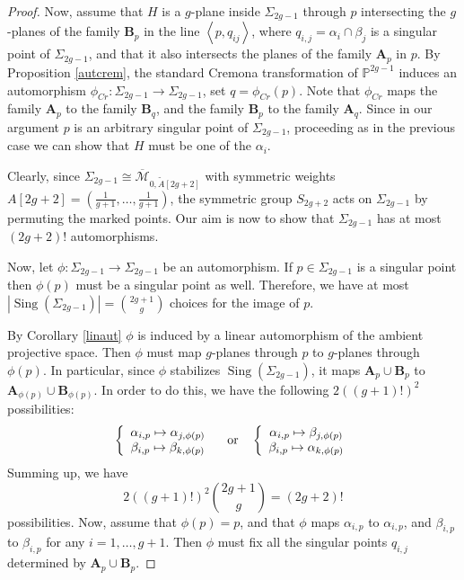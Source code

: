 \documentclass[a4paper,10pt]{amsart}
\theoremstyle{definition}
\newcommand{\cM}{\overline{\mathcal{M}}}
\DeclareMathOperator{\Sing}{Sing}
\begin{document}
\begin{proof}
Now, assume that $H$ is a $g$-plane inside $\Sigma_{2g-1}$ through $p$ intersecting the $g$-planes of the family $\textbf{B}_p$ in the line $\left\langle p, q_{ij}\right\rangle$, where $q_{i,j} = \alpha_i\cap \beta_j$ is a singular point of $\Sigma_{2g-1}$, and that it also intersects the planes of the family $\textbf{A}_p$ in $p$. By Proposition \ref{autcrem}, the standard Cremona transformation of $\mathbb{P}^{2g-1}$ induces an automorphism $\phi_{Cr}:\Sigma_{2g-1}\rightarrow \Sigma_{2g-1}$, set $q = \phi_{Cr}(p)$. Note that $\phi_{Cr}$ maps the family $\textbf{A}_p$ to the family $\textbf{B}_q$, and the family $\textbf{B}_p$ to the family $\textbf{A}_q$. Since in our argument $p$ is an arbitrary singular point of $\Sigma_{2g-1}$, proceeding as in the previous case we can show that $H$ must be one of the $\alpha_i$.

Clearly, since $\Sigma_{2g-1}\cong\cM_{0,\widetilde{A}[2g+2]}$ with symmetric weights $A[2g+2] = \left(\frac{1}{g+1},\dots,\frac{1}{g+1}\right)$, the symmetric group $S_{2g+2}$ acts on $\Sigma_{2g-1}$ by permuting the marked points. Our aim is now to show that $\Sigma_{2g-1}$ has at most $(2g+2)!$ automorphisms. 

Now, let $\phi:\Sigma_{2g-1}\rightarrow \Sigma_{2g-1}$ be an automorphism. If $p\in \Sigma_{2g-1}$ is a singular point then $\phi(p)$ must be a singular point as well. Therefore, we have at most $|\Sing(\Sigma_{2g-1})| = \binom{2g+1}{g}$ choices for the image of $p$.  

By Corollary \ref{linaut} $\phi$ is induced by a linear automorphism of the ambient projective space. Then $\phi$ must map $g$-planes through $p$ to $g$-planes through $\phi(p)$. In particular, since $\phi$ stabilizes $\Sing(\Sigma_{2g-1})$, it maps $\textbf{A}_p\cup \textbf{B}_p$ to $\textbf{A}_{\phi(p)}\cup \textbf{B}_{\phi(p)}$. In order to do this, we have the following $2((g+1)!)^2$ possibilities:
$$
\left\lbrace\begin{array}{c}
\alpha_{i,p}\mapsto \alpha_{j,\phi(p)} \\ 
\beta_{i,p}\mapsto \beta_{k,\phi(p)}
\end{array}\right.\quad
\rm{or}\quad
\left\lbrace\begin{array}{c}
\alpha_{i,p}\mapsto \beta_{j,\phi(p)} \\ 
\beta_{i,p}\mapsto \alpha_{k,\phi(p)}
\end{array}\right.
$$
Summing up, we have 
$$2((g+1)!)^2\binom{2g+1}{g} = (2g+2)!$$
possibilities. Now, assume that $\phi(p)=p$, and that $\phi$ maps $\alpha_{i,p}$ to $\alpha_{i,p}$, and $\beta_{i,p}$ to $\beta_{i,p}$ for any $i = 1,\dots,g+1$. Then $\phi$ must fix all the singular points $q_{i,j}$ determined by $\textbf{A}_p\cup \textbf{B}_p$.


\end{proof}
\end{document}
